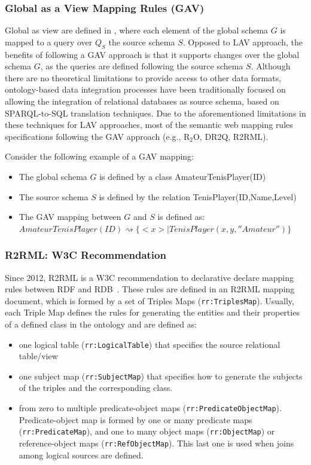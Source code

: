 \subsubsection{Global as a View Mapping Rules (GAV)}
Global as view are defined in \citep{halevy2001answering}, where each element of the global schema $G$ is mapped to a query over $Q_S$ the source schema $S$. Opposed to LAV approach, the benefits of following a GAV approach is that it supports changes over the global schema $G$, as the queries are defined following the source schema $S$. Although there are no theoretical limitations to provide access to other data formats, ontology-based data integration processes have been traditionally focused on allowing the integration of relational databases as source schema, based on SPARQL-to-SQL translation techniques. Due to the aforementioned limitations in these techniques for LAV approaches, most of the semantic web mapping rules specifications following the GAV approach (e.g., R$_2$O, DR2Q, R2RML). 

Consider the following example of a GAV mapping:
\begin{itemize}
    \item The global schema $G$ is defined by a class AmateurTenisPlayer(ID)
    \item The source schema $S$ is defined by the relation TenisPlayer(ID,Name,Level)
    \item The GAV mapping between $G$ and $S$ is defined as:\\
    $AmateurTenisPlayer(ID) \rightsquigarrow \{<x> | TenisPlayer(x,y,''Amateur'')\}$
\end{itemize}

\subsubsection{R2RML: W3C Recommendation}
Since 2012, R2RML is a W3C recommendation to declarative declare mapping rules between RDF and RDB~\citep{R2RML}. These rules are defined in an R2RML mapping document, which is formed by a set of Triples Maps (\texttt{rr:TriplesMap}). Usually, each Triple Map defines the rules for generating the entities and their properties of a defined class in the ontology and are defined as:
\begin{itemize}
    \item one logical table (\texttt{rr:LogicalTable}) that specifies the source relational table/view
    \item one subject map (\texttt{rr:SubjectMap}) that specifies how to generate the subjects of the triples and the corresponding class.
    \item from zero to multiple predicate-object maps (\texttt{rr:PredicateObjectMap}). Predicate-object map is formed by one or many predicate maps (\texttt{rr:PredicateMap}), and one to many object maps (\texttt{rr:ObjectMap}) or reference-object maps (\texttt{rr:RefObjectMap}). This last one is used when joins among logical sources are defined.
\end{itemize}

